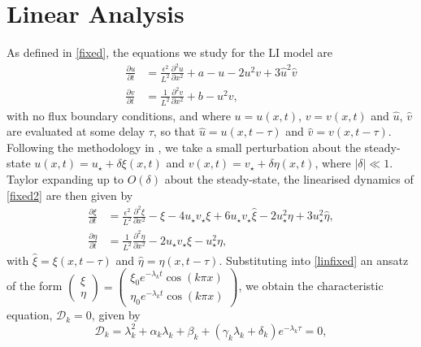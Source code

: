 \section{Linear Analysis}
As defined in \eqref{fixed}, the equations we study for the LI model are
\begin{equation}\label{fixed2}
  \begin{split}
  \frac{\partial u}{\partial t}&=\frac{\epsilon^2}{L^2}\frac{\partial^2u}{\partial x^2}+a-u-2u^2v+3\hat{u}^2\hat{v}\\
  \frac{\partial v}{\partial t}&=\frac{1}{L^2}\frac{\partial^2v}{\partial x^2}+b-u^2v,
\end{split}
\end{equation}
with no flux boundary conditions, and where $u=u(x,t)$, $v=v(x,t)$ and $\hat{u}$, $\hat{v}$ are evaluated at some delay $\tau$, so that $\hat{u}=u(x,t-\tau)$ and $\hat{v}=v(x,t-\tau)$. Following the methodology in \cite{yigaffneyli}, we take a small perturbation about the steady-state $u(x,t)=u_\star+\delta\xi(x,t)$ and $v(x,t)=v_\star+\delta\eta(x,t)$, where $|\delta|\ll 1$. Taylor expanding up to $O(\delta)$ about the steady-state, the linearised dynamics of \eqref{fixed2} are then given by
\begin{equation}\label{linfixed}
  \begin{split}
\frac{\partial\xi}{\partial t}&=\frac{\epsilon^2}{L^2}\frac{\partial^2\xi}{\partial x^2}-\xi-4u_\star v_\star\xi+6u_\star v_\star\hat{\xi}-2u_\star^2\eta+3u_\star^2\hat{\eta},\\
\frac{\partial\eta}{\partial t}&=\frac{1}{L^2}\frac{\partial^2\eta}{\partial x^2}-2u_\star v_\star\xi-u_\star^2\eta,
\end{split}
\end{equation}
with $\hat{\xi}=\xi(x,t-\tau)$ and $\hat{\eta}=\eta(x,t-\tau)$. Substituting into \eqref{linfixed} an ansatz of the form $\begin{pmatrix}\xi\\\eta\end{pmatrix}=\begin{pmatrix}\xi_0e^{-\lambda_k t}\cos(k\pi x)\\ \eta_0e^{-\lambda_k t}\cos(k\pi x)\end{pmatrix}$, we obtain the characteristic equation, $\mathcal{D}_k=0$, given by
\begin{equation}\label{characfix}
\mathcal{D}_k=\lambda_k^2+\alpha_k\lambda_k+\beta_k+(\gamma_k\lambda_k+\delta_k)e^{-\lambda_k\tau}=0,
\end{equation}
